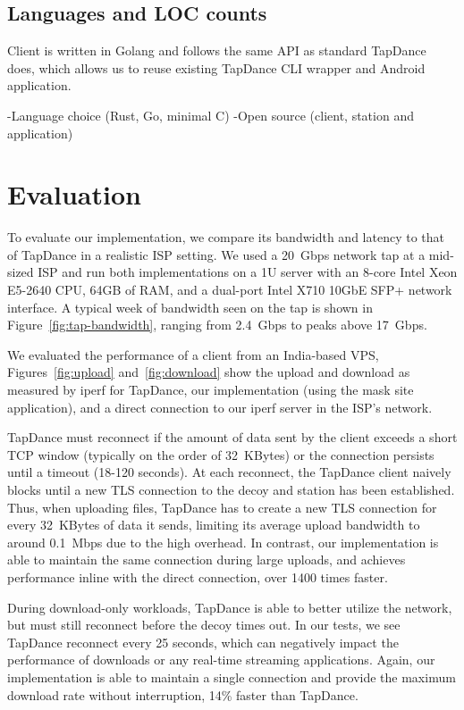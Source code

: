 \documentclass[sigconf,anonymous]{acmart}
\newcommand{\TODO}[1]{\hl{TODO: #1}\xspace}
\begin{document}
\subsection{Languages and LOC counts} %
Client is written in Golang and follows the same API as standard TapDance does,
which allows us to reuse existing TapDance CLI wrapper and Android application.

-Language choice (Rust, Go, minimal C)
-Open source (client, station and application)
\fi


\section{Evaluation}
\label{sec:evaluation}


\FigUpload
\FigDownload

To evaluate our \scheme implementation, we compare its bandwidth and latency
to that of TapDance in a realistic ISP setting. We used a 20~Gbps
network tap at a mid-sized ISP and run both implementations on a 1U server with
an 8-core Intel Xeon E5-2640 CPU, 64GB of RAM, and a dual-port Intel X710 10GbE SFP+
network interface. A typical week of bandwidth seen on the tap is
shown in Figure~\ref{fig:tap-bandwidth}, ranging from 2.4~Gbps to peaks above
17~Gbps.


We evaluated the performance of a client from an India-based VPS,
Figures~\ref{fig:upload} and~\ref{fig:download} show the upload and download as
measured by iperf for TapDance, our \scheme implementation (using the mask site application),
and a direct connection to our iperf server in the ISP's network.

TapDance must reconnect if the amount of data sent by the client
exceeds a short TCP window (typically on the order of 32~KBytes) or the
connection persists until a timeout (18-120 seconds). At each reconnect, the
TapDance client naively blocks until a new TLS connection to the decoy and
station has been established. Thus, when uploading files, TapDance has to create
a new TLS connection for every 32~KBytes of data it sends, limiting its average
upload bandwidth to around 0.1~Mbps due to the high overhead. In contrast,
our \scheme implementation is
able to maintain the same connection during large uploads, and achieves
performance inline with the direct connection, over 1400 times faster.

During download-only workloads, TapDance is able to better utilize the network,
but must still reconnect before the decoy times out. In our tests, we see
TapDance reconnect every 25 seconds, which can negatively impact the performance of
downloads or any real-time streaming applications. Again, our \scheme
implementation is able to maintain a single connection and provide the maximum
download rate without interruption, 14\% faster than TapDance.
\end{document}
